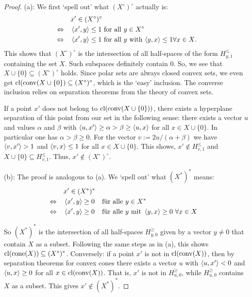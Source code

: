 \begin{proof}
	(a): We first `spell out' what $(X^\circ)^\circ$ actually is: 
	\begin{align*}
		& & & x' \in (X^\circ)^\circ 
		\\ &\Leftrightarrow & & 
		\sprod{x'}{y} \le 1 \ \text{for all} \  y \in X^\circ
		\\ &\Leftrightarrow & & \sprod{x'}{y} \le 1 \ \text{for all $y$ with $\sprod{y}{x} \le 1\forall x \in X$}. 
	\end{align*}
	This shows that $(X^\circ)^\circ$ is the intersection of all half-spaces of the form $H_{y,1}^\le$ containing the set $X$. Such subspaces definitely contain $0$. So, we see that $X \cup \{0\} \subseteq (X^\circ)^\circ$ holds. Since polar sets are always closed convex sets, we even get $\operatorname{cl}(\operatorname{conv}(X \cup \{0\}) \subseteq (X^\circ)^\circ$, which is the `easy' inclusion. The converse inclusion relies on separation theorems from the theory of convex sets. 
	
	If a point $x'$ does not belong to $\operatorname{cl}(\operatorname{conv}(X \cup \{0\}))$, there exists a hyperplane separation of this point from our set in the following sense: there exists a vector $u$ and values $\alpha $ and $\beta$ with  $\left\langle u , x' \right\rangle \ge \alpha > \beta \ge \left\langle u , x \right\rangle$ for all $x \in X \cup \{0\}$. In particular one has $\alpha > \beta \ge 0$. For the vector $v := 2 u / (\alpha + \beta)$ we have $\left\langle v , x' \right\rangle > 1$ and $\left\langle v , x \right\rangle \le 1$ for all $x \in X \cup \{0\}$. This shows, $x'\not\in H_{v,1}^\le$ and $X \cup \{0\} \subseteq H_{v,1}^\le$. Thus, $x' \not \in (X^\circ)^\circ$.
	

	(b): The proof is analogous to (a). We `spell out' what $(X^\ast)^\ast$ means: 
	\begin{align*}
		&& &x' \in (X^\ast)^\ast
		\\ &\Leftrightarrow & &\left\langle x' , y \right\rangle \ge 0 & &\text{für alle} \ y \in X^\ast
		\\ &\Leftrightarrow & & \left\langle x' , y \right\rangle \ge 0 & & \text{für alle} \ y \ \text{mit} \ \left\langle y , x \right\rangle \ge 0 \ \forall x \in X
	\end{align*}
	
	So $(X^\ast)^\ast$ is the intersection of all half-spaces $H_{y,0}^\ge $ given by a vector $y \ne 0$ that contain $X$ as a subset. Following the same steps as in (a), this shows $\operatorname{cl}(\operatorname{cone}(X)) \subseteq (X^\ast)^\ast$. Conversely: if a point $x'$ is not in $\operatorname{cl}(\operatorname{conv}(X))$, then by separation theorems for convex cones there exists a vector $u$ with $\left\langle u , x' \right\rangle < 0$ and $\left\langle u , x \right\rangle \ge 0$ for all $x \in \operatorname{cl}(\operatorname{conv}(X))$. That is, $x'$ is not in $H_{u,0}^\ge$, while $H_{u,0}^\ge $ contains $X$ as a subset. This gives $x' \not \in (X^\ast)^\ast$. 
\end{proof}


